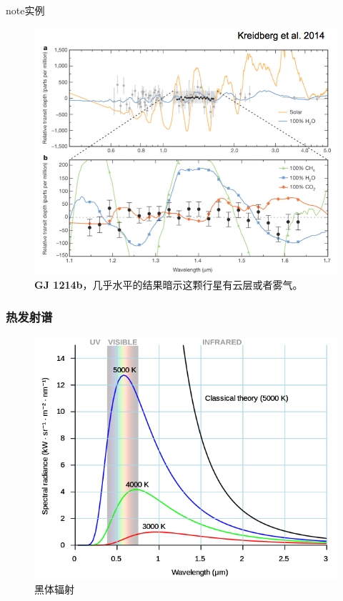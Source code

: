 \documentclass[letterpaper,10pt,english]{sphinxmanual}
\begin{document}
\begin{notice}{note}{实例}
\begin{figure}[htbp]
\includegraphics{transmission4.png}
\caption{\textbf{GJ 1214b}，几乎水平的结果暗示这颗行星有云层或者雾气。}\end{figure}
\end{notice}


\subsubsection{热发射谱}
\label{atmosphere:id8}\begin{figure}[htbp]
\centering
\capstart

\includegraphics{600px-Black_body.svg.png}
\caption{黑体辐射}\end{figure}
\end{document}

